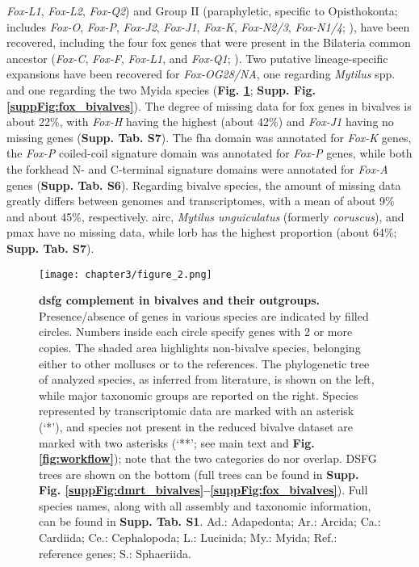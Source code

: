 \documentclass[../main.tex]{subfiles}
\begin{document}
\textit{Fox-L1}, \textit{Fox-L2}, \textit{Fox-Q2}) and Group II (paraphyletic, specific to Opisthokonta; includes \textit{Fox-O}, \textit{Fox-P}, \textit{Fox-J2}, \textit{Fox-J1}, \textit{Fox-K}, \textit{Fox-N2/3}, \textit{Fox-N1/4}; \textbf{\cite{larroux2008genesis}}), have been recovered, including the four \gls{fox} genes that were present in the Bilateria common ancestor (\textit{Fox-C}, \textit{Fox-F}, \textit{Fox-L1}, and \textit{Fox-Q1}; \textbf{\cite{shimeld2010clustered}}). Two putative lineage-specific expansions have been recovered for \textit{Fox-OG28/NA}, one regarding \textit{Mytilus} spp. and one regarding the two Myida species (\textbf{Fig. \ref{fig:DSFG_bivalveCompilation}}; \textbf{Supp. Fig. \ref{suppFig:fox_bivalves}}). The degree of missing data for \gls{fox} genes in bivalves is about 22\%, with \textit{Fox-H} having the highest (about 42\%) and \textit{Fox-J1} having no missing genes (\textbf{Supp. Tab. S7}). The \gls{fha} domain was annotated for \textit{Fox-K} genes, the \textit{Fox-P} coiled-coil signature domain was annotated for \textit{Fox-P} genes, while both the forkhead N- and C-terminal signature domains were annotated for \textit{Fox-A} genes (\textbf{Supp. Tab. S6}).
Regarding bivalve species, the amount of missing data greatly differs between genomes and transcriptomes, with a mean of about 9\% and about 45\%, respectively. \gls{airc}, \textit{Mytilus unguiculatus} (formerly \textit{coruscus}), and \gls{pmax} have no missing data, while \gls{lorb} has the highest proportion (about 64\%; \textbf{Supp. Tab. S7}).


\begin{figure}
	\centering
	\texttt{[image: chapter3/figure\_2.png]}
	\captionsetup{width=\textwidth}
	\caption{
		\textbf{\gls{dsfg} complement in bivalves and their outgroups.} Presence/absence of genes in various species are indicated by filled circles. Numbers inside each circle specify genes with 2 or more copies. The shaded area highlights non-bivalve species, belonging either to other molluscs or to the references. The phylogenetic tree of analyzed species, as inferred from literature, is shown on the left, while major taxonomic groups are reported on the right. Species represented by transcriptomic data are marked with an asterisk (‘*’), and species not present in the reduced bivalve dataset are marked with two asterisks (‘**’; see main text and \textbf{Fig. \ref{fig:workflow}}); note that the two categories do nor overlap. DSFG trees are shown on the bottom (full trees can be found in \textbf{Supp. Fig. \ref{suppFig:dmrt_bivalves}--\ref{suppFig:fox_bivalves}}). Full species names, along with all assembly and taxonomic information, can be found in \textbf{Supp. Tab. S1}.  Ad.: Adapedonta; Ar.: Arcida; Ca.: Cardiida; Ce.: Cephalopoda; L.: Lucinida; My.: Myida; Ref.: reference genes; S.: Sphaeriida.
	}
	\label{fig:DSFG_bivalveCompilation}
\end{figure}
\end{document}
